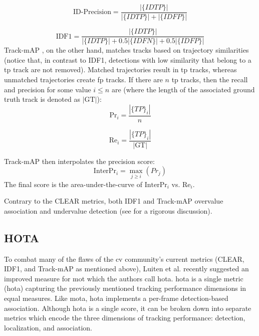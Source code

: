 \documentclass[headsepline, hidelinks, footsepline, footinclude=false, oneside, fontsize=11pt, paper=a4, listof=totoc, bibliography=totoc]{scrbook}
\begin{document}
\begin{equation}
\text{ID-Precision} = \frac{|\{IDTP\}|}{|\{IDTP\}| + |\{IDFP\}|}
\end{equation}

\begin{equation}
\text{IDF1} = \frac{|\{IDTP\}|}{|\{IDTP\}| + 0.5|\{IDFN\}| + 0.5|\{IDFP\}|}
\end{equation}
Track-\gls{mAP} \cite{russakovskyImageNetLargeScale2015}, on the other hand, matches tracks based on trajectory similarities 
(notice that, in contrast to IDF1, detections with low similarity that belong to a \gls{tp} track are not removed).
Matched trajectories result in \gls{tp} tracks, whereas unmatched trajectories create \gls{fp} tracks. If there are \(n\) \gls{tp} tracks, then the recall and precision for some value \(i \leq n\) are (where the length of the associated ground truth track is denoted as \(|\text{GT}|\)):
\begin{equation}
\text{Pr}_i = \frac{|\{TP\}_i|}{n}
\end{equation}

\begin{equation}
\text{Re}_i = \frac{|\{TP\}_i|}{|\text{GT}|}
\end{equation}

Track-mAP then interpolates the precision score:
\begin{equation}
\text{InterPr}_i = \max_{j \geq i}(Pr_j)
\end{equation}
The final score is the area-under-the-curve of \(\text{InterPr}_i\) vs. \(\text{Re}_i\).

Contrary to the CLEAR metrics, both IDF1 and Track-mAP overvalue association and undervalue detection (see \cite{luitenHOTAHigherOrder2021} for a rigorous discussion).

\subsection{HOTA \label{hota}}
\label{sec:org6fbafc0}
    To combat many of the flaws of the \gls{cv} community's current metrics (CLEAR, IDF1, and Track-mAP as mentioned above), Luiten et al. \cite{luitenHOTAHigherOrder2021} recently suggested an improved measure for \gls{mot} which the authors call \gls{hota}.
\gls{hota} is a single metric (\gls{hota}) capturing the previously mentioned tracking performance dimensions in equal measures.
Like \gls{mota}, \gls{hota} implements a per-frame detection-based association. 
Although \gls{hota} is a single score, it can be broken down into separate metrics which encode the three dimensions of tracking performance: detection, localization, and association. 
\end{document}
